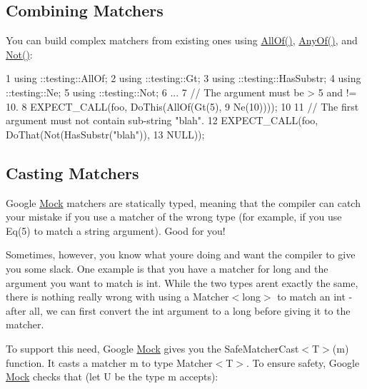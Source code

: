 \subsection*{Combining Matchers}

You can build complex matchers from existing ones using {\ttfamily \hyperlink{namespacetesting_af7618e8606c1cb45738163688944e2b7}{All\+Of()}}, {\ttfamily \hyperlink{namespacetesting_a81cfefd9f75cdce827d5bc873cf73aac}{Any\+Of()}}, and {\ttfamily \hyperlink{namespacetesting_a3d7d0dda7e51b13fe2f5aa28e23ed6b6}{Not()}}\+:


\begin{DoxyCode}
1 using ::testing::AllOf;
2 using ::testing::Gt;
3 using ::testing::HasSubstr;
4 using ::testing::Ne;
5 using ::testing::Not;
6 ...
7   // The argument must be > 5 and != 10.
8   EXPECT\_CALL(foo, DoThis(AllOf(Gt(5),
9                                 Ne(10))));
10 
11   // The first argument must not contain sub-string "blah".
12   EXPECT\_CALL(foo, DoThat(Not(HasSubstr("blah")),
13                           NULL));
\end{DoxyCode}


\subsection*{Casting Matchers}

Google \hyperlink{class_mock}{Mock} matchers are statically typed, meaning that the compiler can catch your mistake if you use a matcher of the wrong type (for example, if you use {\ttfamily Eq(5)} to match a {\ttfamily string} argument). Good for you!

Sometimes, however, you know what you\textquotesingle{}re doing and want the compiler to give you some slack. One example is that you have a matcher for {\ttfamily long} and the argument you want to match is {\ttfamily int}. While the two types aren\textquotesingle{}t exactly the same, there is nothing really wrong with using a {\ttfamily Matcher$<$long$>$} to match an {\ttfamily int} -\/ after all, we can first convert the {\ttfamily int} argument to a {\ttfamily long} before giving it to the matcher.

To support this need, Google \hyperlink{class_mock}{Mock} gives you the {\ttfamily Safe\+Matcher\+Cast$<$T$>$(m)} function. It casts a matcher {\ttfamily m} to type {\ttfamily Matcher$<$T$>$}. To ensure safety, Google \hyperlink{class_mock}{Mock} checks that (let {\ttfamily U} be the type {\ttfamily m} accepts)\+:


